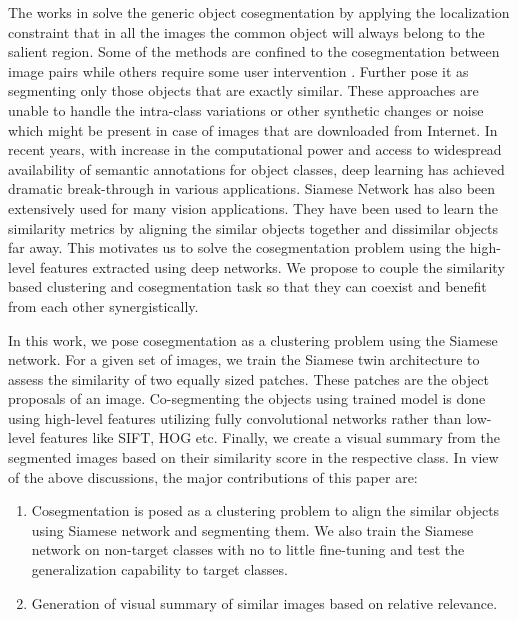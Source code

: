\documentclass[conference]{IEEEtran}
\begin{document}
The works in \cite{wang2015robust, li2016object, Huang2016ObjectCB} solve the generic object cosegmentation by applying the localization constraint that in all the images the common object will always belong to the salient region. Some of the methods are confined to the cosegmentation between image pairs \cite{rother2006cosegmentation, wang2013image, joulin2012multi} while others require some user intervention \cite{batra2010icoseg, kowdle2010imodel}. Further \cite{rother2006cosegmentation, mukherjee2009half} pose it as segmenting only those objects that are exactly similar. These approaches are unable to handle the intra-class variations or other synthetic changes or noise which might be present in case of images that are downloaded from Internet. In recent years, with increase in the computational power and access to widespread availability
of semantic annotations for object classes, deep learning has achieved dramatic break-through in various applications. Siamese Network has also been extensively used for many vision applications. They have been used to learn the similarity metrics by aligning the similar objects together and dissimilar objects far away. This motivates us to solve the cosegmentation problem using the high-level features extracted using deep networks. We propose to couple the similarity based clustering and cosegmentation task so that they can coexist and benefit from each other synergistically.   


In this work, we pose cosegmentation as a clustering problem using the Siamese network. For a given set of images, we train the Siamese twin architecture to assess the similarity of two equally sized patches. These patches are the object proposals of an image. Co-segmenting the objects using trained model is done using high-level features utilizing  fully convolutional networks \cite{long2015fully} rather than low-level features like SIFT, HOG etc. Finally, we create a visual summary from the segmented images based on their similarity score in the respective class. In view of the above discussions, the major contributions of this paper are:

\begin{enumerate}
\item Cosegmentation is posed as a clustering problem to align the similar objects using Siamese network and segmenting them. We also train the Siamese network on non-target classes with no to little fine-tuning 
and test the generalization capability to target classes.
\item Generation of visual summary of similar images based on relative relevance.
\end{enumerate}
\end{document}
